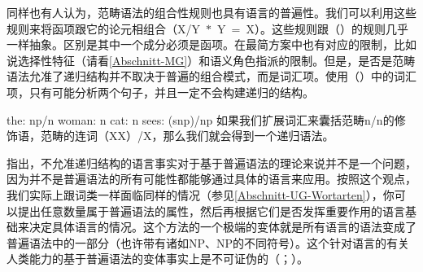 同样也有人认为，范畴语法\indexcgc 的组合性规则也具有语言的普遍性。我们可以利用这些规则来将函项跟它的论元相组合（\mbox{X/Y $*$ Y = X}）。这些规则跟（）的规则几乎一样抽象。区别是其中一个成分必须是函项。在最简方案\indexmpc 中也有对应的限制，比如说选择性特征（请看\ref{Abschnitt-MG}）和语义角色指派的限制。但是，是否是范畴语法允准了递归结构并不取决于普遍的组合模式，而是词汇项。使用（）中的词汇项，只有可能分析两个句子，并且一定不会构建递归的结构。

\eal
\ex the: np/n
\ex woman: n
\ex cat: n
\ex sees: (s\bs np)/np
\zl
如果我们扩展词汇来囊括范畴n/n的修饰语，范畴的连词（X\bs X）/X，那么我们就会得到一个递归语法。

 \citet*[]{FHC2005a}指出，不允准递归结构的语言事实对于基于普遍语法的理论来说并不是一个问题，因为并不是普遍语法的所有可能性都能够通过具体的语言来应用。按照这个观点，我们实际上跟词类一样面临同样的情况（参见\ref{Abschnitt-UG-Wortarten}），你可以提出任意数量属于普遍语法的属性，然后再根据它们是否发挥重要作用的语言基础来决定具体语言的情况。这个方法的一个极端的变体就是所有语言的语法变成了普遍语法中的一部分（也许带有诸如NP、NP的不同符号）。这个针对语言的有关人类能力的基于普遍语法的变体事实上是不可证伪的（\citealp[, 443]{EL2009a}；\citealp[]{Tomasello2009a}）。

